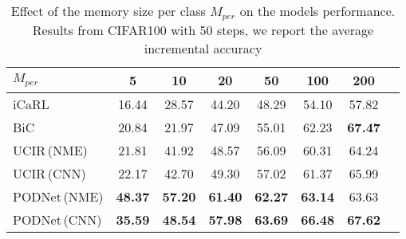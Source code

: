 \begin{table}[t]
    \centering
    \caption{Effect of the memory size per class $M_{per}$ on the models performance. Results from CIFAR100 with 50 steps, we report the average incremental accuracy}
    \label{tab:ablation_memorysize}
    \begin{tabular}{@{}lccccccc@{}}
        \toprule
        $M_{per}$                                    & 5              & 10             & \textbf{20}    & 50             & 100            & 200            \\
        \midrule
        iCaRL \cite{rebuffi2017icarl}                & 16.44          & 28.57          & 44.20          & 48.29          & 54.10          & 57.82          \\
        BiC \cite{wu2019bias_correction}             & 20.84          & 21.97          & 47.09          & 55.01          & 62.23          & \textbf{67.47} \\
        UCIR\,{\scriptsize (NME)} \cite{hou2019ucir} & 21.81          & 41.92          & 48.57          & 56.09          & 60.31          & 64.24          \\
        UCIR\,{\scriptsize (CNN)} \cite{hou2019ucir} & 22.17          & 42.70          & 49.30          & 57.02          & 61.37          & 65.99          \\
        PODNet\,{\scriptsize (NME)}                  & \textbf{48.37} & \textbf{57.20} & \textbf{61.40} & \textbf{62.27} & \textbf{63.14} & 63.63          \\
        PODNet\,{\scriptsize (CNN)}                  & \textbf{35.59} & \textbf{48.54} & \textbf{57.98} & \textbf{63.69} & \textbf{66.48} & \textbf{67.62} \\
        \bottomrule
    \end{tabular}
\end{table}
